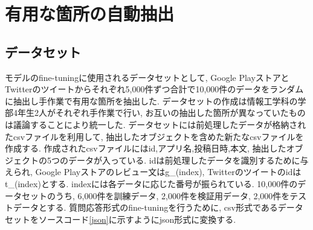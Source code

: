 

\section{有用な箇所の自動抽出}
\subsection{データセット}
モデルのfine-tuningに使用されるデータセットとして, Google PlayストアとTwitterのツイートからそれぞれ5,000件ずつ合計で10,000件のデータをランダムに抽出し手作業で有用な箇所を抽出した. データセットの作成は情報工学科の学部4年生2人がそれぞれ手作業で行い, お互いの抽出した箇所が異なっていたものは議論することにより統一した. 
データセットには前処理したデータが格納されたcsvファイルを利用して, 抽出したオブジェクトを含めた新たなcsvファイルを作成する. 作成されたcsvファイルにはid,アプリ名,投稿日時,本文, 抽出したオブジェクトの5つのデータが入っている. idは前処理したデータを識別するために与えられ, Google Playストアのレビュー文はg\_(index), Twitterのツイートのidはt\_(index)とする.  indexには各データに応じた番号が振られている. 
10,000件のデータセットのうち, 6,000件を訓練データ, 2,000件を検証用データ, 2,000件をテストデータとする. 質問応答形式のfine-tuningを行うために, csv形式であるデータセットをソースコード\ref{json}に示すようにjson形式に変換する. 

